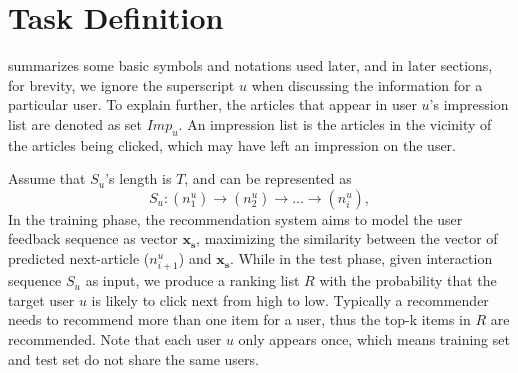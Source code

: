 \section{Task Definition}
\label{sec:task}
 summarizes some basic symbols and notations used later, 
and in later sections, for brevity, we ignore the superscript $u$ 
when discussing the information for a particular user.
To explain further, the articles that appear in user $u$'s impression list are denoted as set $Imp_u$. An impression list is the articles in the vicinity of the articles
being clicked, which may have left an impression on the user.

Assume that $S_u$'s length is $T$, and can be represented as \[S_u: (n_1^u)\rightarrow(n_2^u)\rightarrow...\rightarrow(n_i^u),\] 
In the training phase, the recommendation system aims to model the 
user feedback sequence as vector $\mathbf{x_s}$, 
maximizing the similarity between
the vector of predicted next-article ($n_{i+1}^u$) and $\mathbf{x_s}$. 
While in the test phase, 
given interaction sequence $S_u$ as input, 
we produce a ranking list $R$ with the probability that the target user $u$ is likely to click next from high to low. 
Typically a recommender needs to recommend more
than one item for a user, thus the top-k items in $R$ are recommended.
Note that each user $u$ only appears once, 
which means training set and test set do not share the same users. 

